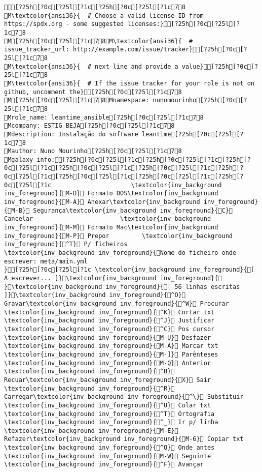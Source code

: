 \documentclass{scrartcl}
\begin{document}
\begin{Verbatim}
[?25h[?0c[?25l[?1c[?25h[?0c[?25l[?1c78
M\textcolor{ansi36}{  # Choose a valid license ID from https://spdx.org - some suggested licenses:}[?25h[?0c[?25l[?1c78
M[?25h[?0c[?25l[?1c78M\textcolor{ansi36}{  # issue_tracker_url: http://example.com/issue/tracker}[?25h[?0c[?25l[?1c78
M\textcolor{ansi36}{  # next line and provide a value}[?25h[?0c[?25l[?1c78
M\textcolor{ansi36}{  # If the issue tracker for your role is not on github, uncomment the}[?25h[?0c[?25l[?1c78
M[?25h[?0c[?25l[?1c78Mnamespace: nunomourinho[?25h[?0c[?25l[?1c78
Mrole_name: leantime_ansible[?25h[?0c[?25l[?1c78
Mcompany: ESTIG BEJA[?25h[?0c[?25l[?1c78
Mdescription: Instalação do software leantime[?25h[?0c[?25l[?1c78
Mauthor: Nuno Mourinho[?25h[?0c[?25l[?1c78
Mgalaxy_info:[?25h[?0c[?25l[?1c[?25h[?0c[?25l[?1c[?25h[?0c[?25l[?1c[?25h[?0c[?25l[?1c[?25h[?0c[?25l[?1c[?25h[?0c[?25l[?1c[?25h[?0c[?25l[?1c[?25h[?0c[?25l[?1c[?25h[?0c[?25l[?1c                      \textcolor{inv_background inv_foreground}{M-D} Formato DOS\textcolor{inv_background inv_foreground}{M-A} Anexar\textcolor{inv_background inv_foreground}{M-B} Segurança\textcolor{inv_background inv_foreground}{C} Cancelar                        \textcolor{inv_background inv_foreground}{M-M} Formato Mac\textcolor{inv_background inv_foreground}{M-P} Prepor         \textcolor{inv_background inv_foreground}{^T} P/ ficheiros
\textcolor{inv_background inv_foreground}{Nome do ficheiro onde escrever: meta/main.yml                                                                                                                                                 }[?25h[?0c[?25l[?1c \textcolor{inv_background inv_foreground}{[ A escrever... ]}\textcolor{inv_background inv_foreground}{          }\textcolor{inv_background inv_foreground}{[ 56 linhas escritas ]}\textcolor{inv_background inv_foreground}{^O} Gravar\textcolor{inv_background inv_foreground}{^W} Procurar      \textcolor{inv_background inv_foreground}{^K} Cortar txt    \textcolor{inv_background inv_foreground}{^J} Justificar    \textcolor{inv_background inv_foreground}{^C} Pos cursor    \textcolor{inv_background inv_foreground}{M-U} Desfazer     \textcolor{inv_background inv_foreground}{M-A} Marcar txt   \textcolor{inv_background inv_foreground}{M-]} Parênteses   \textcolor{inv_background inv_foreground}{M-Q} Anterior     \textcolor{inv_background inv_foreground}{^B} Recuar\textcolor{inv_background inv_foreground}{X} Sair    \textcolor{inv_background inv_foreground}{^R} Carregar\textcolor{inv_background inv_foreground}{^\} Substituir    \textcolor{inv_background inv_foreground}{^U} Colar txt     \textcolor{inv_background inv_foreground}{^T} Ortografia    \textcolor{inv_background inv_foreground}{^_} Ir p/ linha   \textcolor{inv_background inv_foreground}{M-E} Refazer\textcolor{inv_background inv_foreground}{M-6} Copiar txt   \textcolor{inv_background inv_foreground}{^Q} Onde antes    \textcolor{inv_background inv_foreground}{M-W} Seguinte     \textcolor{inv_background inv_foreground}{^F} Avançar

\end{Verbatim}
\end{document}
